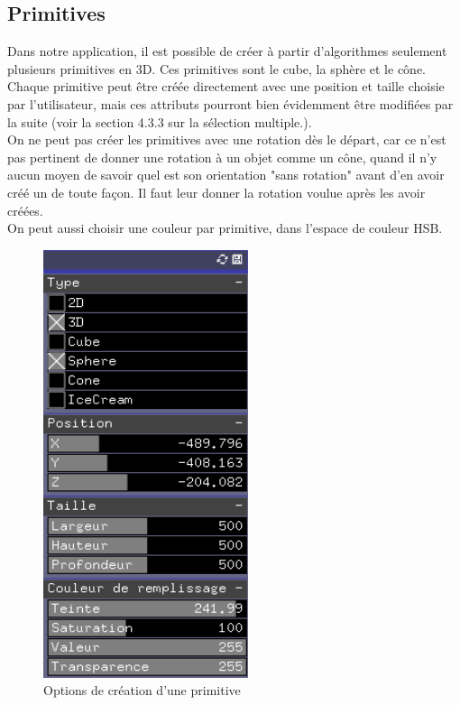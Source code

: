 \newpage

\subsection{Primitives}

Dans notre application, il est possible de créer à partir d'algorithmes seulement plusieurs primitives en 3D. Ces primitives sont le cube, la sphère et le cône. Chaque primitive peut être créée directement avec une position et taille choisie par l'utilisateur, mais ces attributs pourront bien évidemment être modifiées par la suite (voir la section 4.3.3 sur la sélection multiple.).\\

On ne peut pas créer les primitives avec une rotation dès le départ, car ce n'est pas pertinent de donner une rotation à un objet comme un cône, quand il n'y aucun moyen de savoir quel est son orientation "sans rotation" avant d'en avoir créé un de toute façon. Il faut leur donner la rotation voulue après les avoir créées.\\

On peut aussi choisir une couleur par primitive, dans l'espace de couleur HSB.

\begin{figure}[h]
	\centering
	\includegraphics[width=6cm]{fig/creationPrimitive.png}
	\caption{Options de création d'une primitive}
	\label{fig:test}
\end{figure}

